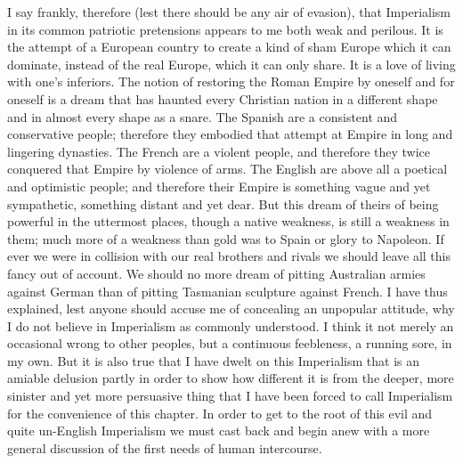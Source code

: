 \documentclass{book}
\begin{document}
I say frankly, therefore (lest there should be any air of evasion), that Imperialism in its common patriotic pretensions appears to me both weak and perilous. It is the attempt of a European country to create a kind of sham Europe which it can dominate, instead of the real Europe, which it can only share. It is a love of living with one’s inferiors. The notion of restoring the Roman Empire by oneself and for oneself is a dream that has haunted every Christian nation in a different shape and in almost every shape as a snare. The Spanish are a consistent and conservative people; therefore they embodied that attempt at Empire in long and lingering dynasties. The French are a violent people, and therefore they twice conquered that Empire by violence of arms. The English are above all a poetical and optimistic people; and therefore their Empire is something vague and yet sympathetic, something distant and yet dear. But this dream of theirs of being powerful in the uttermost places, though a native weakness, is still a weakness in them; much more of a weakness than gold was to Spain or glory to Napoleon. If ever we were in collision with our real brothers and rivals we should leave all this fancy out of account. We should no more dream of pitting Australian armies against German than of pitting Tasmanian sculpture against French. I have thus explained, lest anyone should accuse me of concealing an unpopular attitude, why I do not believe in Imperialism as commonly understood. I think it not merely an occasional wrong to other peoples, but a continuous feebleness, a running sore, in my own. But it is also true that I have dwelt on this Imperialism that is an amiable delusion partly in order to show how different it is from the deeper, more sinister and yet more persuasive thing that I have been forced to call Imperialism for the convenience of this chapter. In order to get to the root of this evil and quite un-English Imperialism we must cast back and begin anew with a more general discussion of the first needs of human intercourse.
\end{document}
